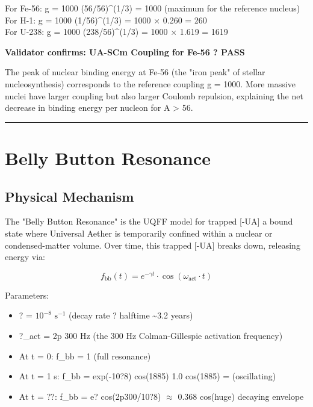 \documentclass[12pt,a4paper]{article}
\begin{document}
For Fe-56: g = 1000  (56/56)\^{}(1/3) = 1000 (maximum for the reference nucleus) \\  For H-1: g = 1000  (1/56)\^{}(1/3) = 1000 $\times$ 0.260 = 260 \\  For U-238: g = 1000  (238/56)\^{}(1/3) = 1000 $\times$ 1.619 = 1619

\textbf{Validator confirms: UA-SCm Coupling for Fe-56 ? PASS}

The peak of nuclear binding energy at Fe-56 (the "iron peak" of stellar nucleosynthesis) corresponds to the reference coupling g = 1000. More massive nuclei have larger coupling but also larger Coulomb repulsion, explaining the net decrease in binding energy per nucleon for A > 56.

\medskip\hrule\medskip

\section{Belly Button Resonance}

\subsection{Physical Mechanism}

The "Belly Button Resonance" is the UQFF model for trapped [-UA]  a bound state where Universal Aether is temporarily confined within a nuclear or condensed-matter volume. Over time, this trapped [-UA] breaks down, releasing energy via:

\begin{equation}
f_{\mathrm{bb}}(t) = e^{-\gamma t} \cdot \cos(\omega_{\mathrm{act}} \cdot t)
\end{equation}

Parameters:

\begin{itemize}
  \item ? = $10^{-8}$ $\mathrm{s}^{-1}$ (decay rate ? halftime \textasciitilde{}3.2 years)
  \item ?\_act = 2p  300 Hz (the 300 Hz Colman-Gillespie activation frequency)
  \item At t = 0: f\_bb = 1 (full resonance)
  \item At t = 1 s: f\_bb = exp(-10?8)  cos(1885)  1.0  cos(1885) = (oscillating)
  \item At t = ??: f\_bb = e?  cos(2p300/10?8) $\approx$ 0.368  cos(huge)  decaying envelope
\end{itemize}
\end{document}
